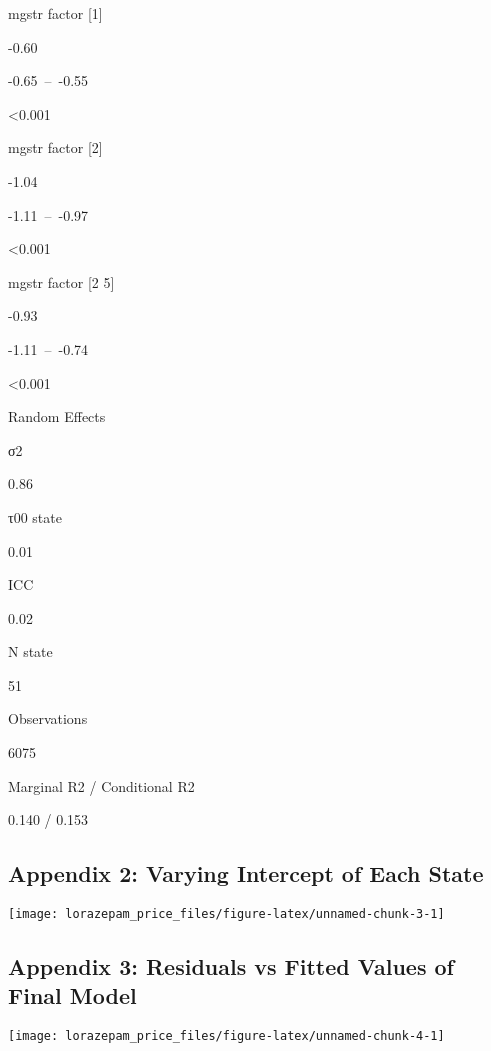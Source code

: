 \documentclass[
]{article}
\begin{document}
mgstr factor {[}1{]}

-0.60

-0.65~--~-0.55

\textless0.001

mgstr factor {[}2{]}

-1.04

-1.11~--~-0.97

\textless0.001

mgstr factor {[}2 5{]}

-0.93

-1.11~--~-0.74

\textless0.001

Random Effects

σ2

0.86

τ00 state

0.01

ICC

0.02

N state

51

Observations

6075

Marginal R2 / Conditional R2

0.140 / 0.153

\newpage

\hypertarget{appendix-2-varying-intercept-of-each-state}{%
\subsection{Appendix 2: Varying Intercept of Each
State}\label{appendix-2-varying-intercept-of-each-state}}

\begin{center}\texttt{[image: lorazepam\_price\_files/figure-latex/unnamed-chunk-3-1]} \end{center}

\newpage

\hypertarget{appendix-3-residuals-vs-fitted-values-of-final-model}{%
\subsection{Appendix 3: Residuals vs Fitted Values of Final
Model}\label{appendix-3-residuals-vs-fitted-values-of-final-model}}

\begin{center}\texttt{[image: lorazepam\_price\_files/figure-latex/unnamed-chunk-4-1]} \end{center}
\end{document}
